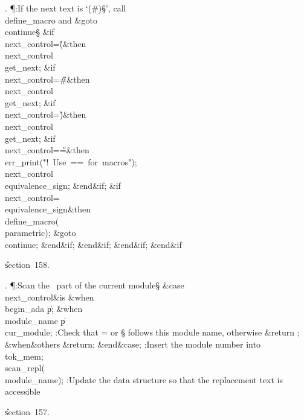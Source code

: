 . \P\?:If the next text is `\?(\?\#\?)\S\?', call \\{define\_macro}
and \&{goto}\8\\{continue}\X\S\?\6
\&{if}\1\1\8\\{next\_control}\?=\?\H{(}\2\8\&{then}\6
\\{next\_control}\?\K\?\\{get\_next};\6
\&{if}\1\1\8\\{next\_control}\?=\?\H{\#}\2\8\&{then}\6
\\{next\_control}\?\K\?\\{get\_next};\6
\&{if}\1\1\8\\{next\_control}\?=\?\H{)}\2\8\&{then}\6
\\{next\_control}\?\K\?\\{get\_next};\6
\&{if}\1\1\8\\{next\_control}\?=\?\H{=}\2\8\&{then}\6
\\{err\_print}\?\1(\?\.{"!\ Use\ ==\ for\ macros"}\?\2)\?;\6
\\{next\_control}\?\K\?\\{equivalence\_sign};\2\6
\&{end}\8\2\&{if}\1;\6
\&{if}\1\1\8\\{next\_control}\?=\?\\{equivalence\_sign}\2\8\&{then}\6
\\{define\_macro}\?\1(\?\\{parametric}\?\2)\?;\5
\&{goto}\8\\{continue};\2\6
\&{end}\8\2\&{if}\1;\2\6
\&{end}\8\2\&{if}\1;\2\6
\&{end}\8\2\&{if}\1;\2\6
\&{end}\8\2\&{if}\1\par
\U section~158.\fi

. \P\?:Scan the \ADA\ part of the current module\X\S\?\6
\&{case}\1\8\\{next\_control}\1\8\&{is}\8\6
\4\&{when}\8\\{begin\_ada}\KR\6
\|p\?\K{};\6
\4\&{when}\8\\{module\_name}\KR\6
\|p\?\K\?\\{cur\_module};\6
:Check that \?=\? or \?\S\? follows this module name, otherwise \&{return}%
\X;\6
\4\&{when}\8\&{others}\8\KR\6
\&{return};\2\6
\4\2\&{end}\8\&{case};\6
:Insert the module number into \\{tok\_mem}\X;\6
\\{scan\_repl}\?\1(\?\\{module\_name}\?\2)\?;\6
:Update the data structure so that the replacement text is accessible\X\par
\U section~157.\fi

